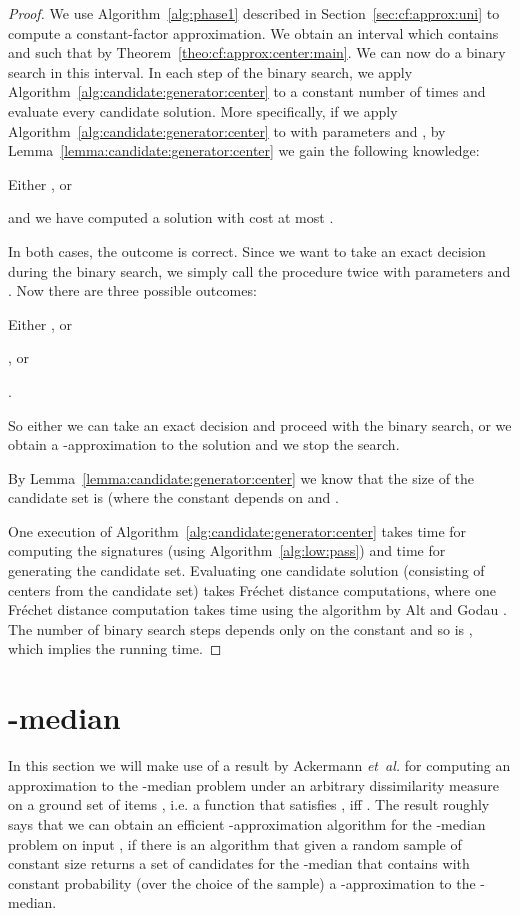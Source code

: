 \documentclass[11pt, letter]{article}
\newcommand{\etal}{\textit{e{}t~a{}l.}\xspace}
\newcommand{\secref}[1]{Section~\ref{sec:#1}}
\newcommand{\thmref}[1]{Theorem~\ref{theo:#1}}
\newcommand{\lemref}[1]{Lemma~\ref{lemma:#1}}
\newcommand{\algref}[1]{Algorithm~\ref{alg:#1}}
\newcommand{\Frechet}{Fr\'echet\xspace}
\begin{document}
\begin{proof}
We use 
\algref{phase1}
described in \secref{cf:approx:uni} to compute a
constant-factor approximation.  We obtain an interval
 which contains
 and such that
 by \thmref{cf:approx:center:main}.
We can now do a binary search in this interval.  
In each step of the binary
search, we apply \algref{candidate:generator:center} to  a constant number
of times and evaluate every candidate solution. 
More specifically, if we apply \algref{candidate:generator:center} to  with parameters
 and , 
by \lemref{candidate:generator:center}
we gain the following knowledge:
\begin{compactenum}[(i)]
\item Either , or
\item  and 
we have computed a solution with cost at most .
\end{compactenum}
In both cases, the outcome is correct. Since we want to take an exact decision 
during the binary search, we simply call the procedure twice with 
parameters  and
. 
Now there are three possible outcomes:
\begin{compactenum}[(i)]
\item Either , or
\item , or
\item .
\end{compactenum} 
So either we can take an exact decision and proceed with the
binary search, or we obtain a -approximation to the solution and we
stop the search.



By \lemref{candidate:generator:center} we know that the size of the
candidate set  is 
(where the constant depends on  and .

One execution of \algref{candidate:generator:center} takes  time for
computing the  signatures (using \algref{low:pass}) and 
 time for generating the candidate set.
Evaluating one candidate solution (consisting of  centers from the candidate set) 
takes  \Frechet distance computations, where one
\Frechet distance computation takes time 
using the algorithm by Alt and Godau
\cite{ag-cfdbt-95}.  The number of binary search steps depends only on the constant
 and so is , which implies the running time.
\end{proof}

\section{-median}

In this section we will make use of a result by Ackermann \etal \cite{abs-cm-10} for 
computing an approximation to the -median problem under an arbitrary dissimilarity
measure  on a ground set of items , i.e. a 
function that satisfies , iff . The result roughly says that
we can obtain an efficient -approximation algorithm for the -median
problem on input , if there is an algorithm that given a random sample 
of constant size returns
a set of candidates for the -median that contains with constant probability (over the
choice of the sample) a -approximation to the -median.
\end{document}
